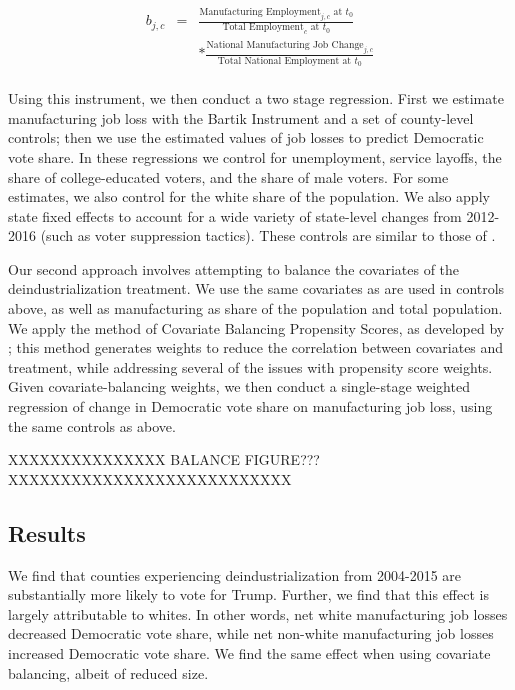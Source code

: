 \documentclass[]{AEA}
\begin{document}
\[
\begin{aligned}
b_{j,c} &=& \frac{\text{Manufacturing Employment}_{j,c} \text{ at } t_0}{\text{Total Employment}_c \text{ at }t_0}  \\
&&  * \frac{\text{National Manufacturing Job Change}_{j,c} }{\text{Total National Employment at }t_0} \\
\end{aligned}
\]

Using this instrument, we then conduct a two stage regression. First we
estimate manufacturing job loss with the Bartik Instrument and a set of
county-level controls; then we use the estimated values of job losses to
predict Democratic vote share. In these regressions we control for
unemployment, service layoffs, the share of college-educated voters, and
the share of male voters. For some estimates, we also control for the
white share of the population. We also apply state fixed effects to
account for a wide variety of state-level changes from 2012-2016 (such
as voter suppression tactics). These controls are similar to those of
\cite{Baccini21}.

Our second approach involves attempting to balance the covariates of the
deindustrialization treatment. We use the same covariates as are used in
controls above, as well as manufacturing as share of the population and
total population. We apply the method of Covariate Balancing Propensity
Scores, as developed by \cite{Imai14}; this method generates weights to
reduce the correlation between covariates and treatment, while
addressing several of the issues with propensity score weights. Given
covariate-balancing weights, we then conduct a single-stage weighted
regression of change in Democratic vote share on manufacturing job loss,
using the same controls as above.

XXXXXXXXXXXXXXX BALANCE FIGURE??? XXXXXXXXXXXXXXXXXXXXXXXXXXX

\subsection{Results}

We find that counties experiencing deindustrialization from 2004-2015
are substantially more likely to vote for Trump. Further, we find that
this effect is largely attributable to whites. In other words, net white
manufacturing job losses decreased Democratic vote share, while net
non-white manufacturing job losses increased Democratic vote share. We
find the same effect when using covariate balancing, albeit of reduced
size.
\end{document}
